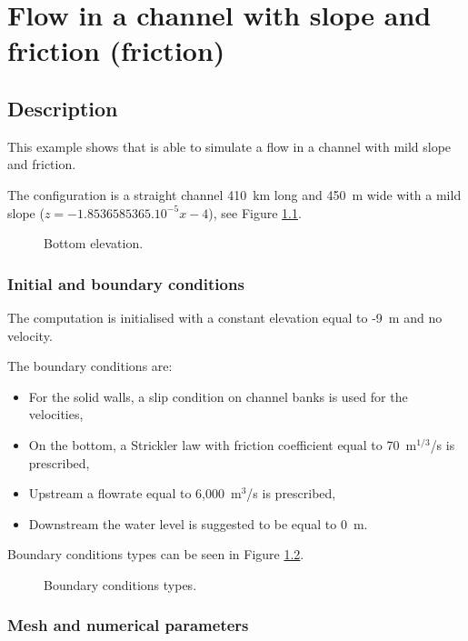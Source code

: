 \chapter{Flow in a channel with slope and friction (friction)}

\section{Description}

This example shows that  is able to simulate a flow in a channel
with mild slope and friction.

The configuration is a straight channel 410~km long and 450~m wide
with a mild slope ($z = -1.8536585365.10^{-5}x-4$),
see Figure \ref{t2d:Friction:fig:bottom}.

\begin{figure}[!htbp]
 \centering
 \caption{Bottom elevation.}
 \label{t2d:Friction:fig:bottom}
\end{figure}

\subsection{Initial and boundary conditions}

The computation is initialised with a constant elevation equal to -9~m
and no velocity.

The boundary conditions are:
\begin{itemize}
\item For the solid walls, a slip condition on channel banks is used for the
velocities,
\item On the bottom, a Strickler law with friction coefficient equal to
70~m$^{1/3}$/s is prescribed,
\item Upstream a flowrate equal to 6,000~m$^3$/s is prescribed,
\item Downstream the water level is suggested to be equal to 0~m.
\end{itemize}

Boundary conditions types can be seen in Figure \ref{t2d:Friction:fig:BC}.

\begin{figure}[!htbp]
 \centering
 \caption{Boundary conditions types.}
 \label{t2d:Friction:fig:BC}
\end{figure}

\subsection{Mesh and numerical parameters}

